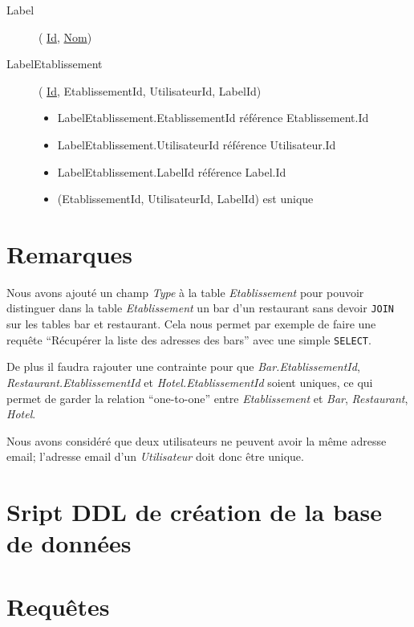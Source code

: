 \documentclass[10pt,a4paper]{article}
\begin{document}
\begin{description}
\item[Label](
    \underline{Id},
    \underline{Nom})

\item[LabelEtablissement](
    \underline{Id},
    EtablissementId,
    UtilisateurId,
    LabelId)

    \begin{itemize}
        \item LabelEtablissement.EtablissementId référence Etablissement.Id
        \item LabelEtablissement.UtilisateurId référence Utilisateur.Id
        \item LabelEtablissement.LabelId référence Label.Id
        \item (EtablissementId, UtilisateurId, LabelId) est unique
    \end{itemize}

\end{description}

\section{Remarques}

Nous avons ajouté un champ \textit{Type} à la table \textit{Etablissement} pour pouvoir distinguer dans la table \textit{Etablissement} un bar d'un restaurant sans devoir \texttt{JOIN} sur les tables bar et restaurant. Cela nous permet par exemple de faire une requête ``Récupérer la liste des adresses des bars'' avec une simple \texttt{SELECT}.

De plus il faudra rajouter une contrainte pour que \textit{Bar.EtablissementId}, \textit{Restaurant.EtablissementId} et \textit{Hotel.EtablissementId} soient uniques, ce qui permet de garder la relation ``one-to-one'' entre \textit{Etablissement} et \textit{Bar}, \textit{Restaurant}, \textit{Hotel}.

Nous avons considéré que deux utilisateurs ne peuvent avoir la même adresse email; l'adresse email d'un \textit{Utilisateur} doit donc être unique.


\section{Sript DDL de création de la base de données}

\section{Requêtes}

\end{document}
